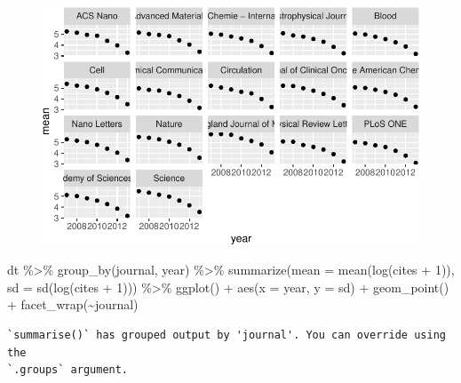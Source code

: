 \documentclass[
  letterpaper,
  DIV=11,
  numbers=noendperiod]{scrreprt}
\newenvironment{Shaded}{\begin{snugshade}}{\end{snugshade}}
\newcommand{\AttributeTok}[1]{\textcolor[rgb]{0.40,0.45,0.13}{#1}}
\newcommand{\DecValTok}[1]{\textcolor[rgb]{0.68,0.00,0.00}{#1}}
\newcommand{\FunctionTok}[1]{\textcolor[rgb]{0.28,0.35,0.67}{#1}}
\newcommand{\NormalTok}[1]{\textcolor[rgb]{0.00,0.23,0.31}{#1}}
\newcommand{\SpecialCharTok}[1]{\textcolor[rgb]{0.37,0.37,0.37}{#1}}
\begin{document}
\begin{figure}[H]

{\centering \includegraphics{./10-model_selection_files/figure-pdf/unnamed-chunk-38-1.pdf}

}

\end{figure}

\begin{Shaded}
\begin{Highlighting}[]
\NormalTok{dt }\SpecialCharTok{\%\textgreater{}\%} 
  \FunctionTok{group\_by}\NormalTok{(journal, year) }\SpecialCharTok{\%\textgreater{}\%} 
  \FunctionTok{summarize}\NormalTok{(}\AttributeTok{mean =} \FunctionTok{mean}\NormalTok{(}\FunctionTok{log}\NormalTok{(cites }\SpecialCharTok{+} \DecValTok{1}\NormalTok{)), }\AttributeTok{sd =} \FunctionTok{sd}\NormalTok{(}\FunctionTok{log}\NormalTok{(cites }\SpecialCharTok{+} \DecValTok{1}\NormalTok{))) }\SpecialCharTok{\%\textgreater{}\%} 
  \FunctionTok{ggplot}\NormalTok{() }\SpecialCharTok{+} 
  \FunctionTok{aes}\NormalTok{(}\AttributeTok{x =}\NormalTok{ year, }\AttributeTok{y =}\NormalTok{ sd) }\SpecialCharTok{+} 
  \FunctionTok{geom\_point}\NormalTok{() }\SpecialCharTok{+} 
  \FunctionTok{facet\_wrap}\NormalTok{(}\SpecialCharTok{\textasciitilde{}}\NormalTok{journal)}
\end{Highlighting}
\end{Shaded}

\begin{verbatim}
`summarise()` has grouped output by 'journal'. You can override using the
`.groups` argument.
\end{verbatim}
\end{document}
